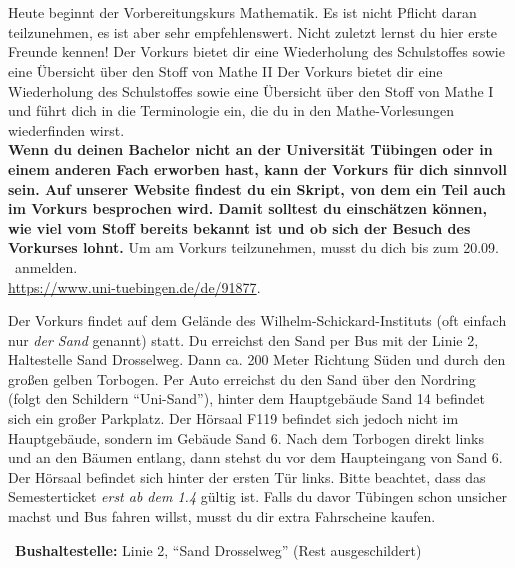 \begin{description}
\ifml
	\item~ %
\else
	\item[Montag, 30. September \YEAR, 10:00 Uhr, Sand 6, Raum F119]\ \\
  Heute beginnt der Vorbereitungskurs Mathematik. Es ist nicht Pflicht daran teilzunehmen,
	es ist aber sehr empfehlenswert. Nicht zuletzt lernst du hier erste Freunde kennen!
	\ifsommersemester
	Der Vorkurs bietet dir eine Wiederholung des Schulstoffes sowie eine Übersicht über den Stoff von Mathe II
	\fi
	\ifwintersemester
	Der Vorkurs bietet dir eine Wiederholung des Schulstoffes sowie eine Übersicht über den Stoff von Mathe I
	\fi
	und führt dich in die Terminologie ein, die du in den Mathe-Vorlesungen wiederfinden wirst.
	\ifmaster
	\\
	\textbf{Wenn du deinen Bachelor nicht an der Universität Tübingen oder in einem anderen Fach erworben hast, kann der Vorkurs für dich sinnvoll sein. Auf unserer Website findest du ein Skript, von dem ein Teil auch im Vorkurs besprochen wird. Damit solltest du einschätzen können, wie viel vom Stoff bereits bekannt ist und ob sich der Besuch des Vorkurses lohnt.}
	\fi
	Um am Vorkurs teilzunehmen, musst du dich bis zum 20.09. \YEAR~anmelden.\\
    \url{https://www.uni-tuebingen.de/de/91877}.

	\ifsommersemester
	Der Vorkurs findet auf dem Gelände des Wilhelm-Schickard-Instituts (oft einfach nur \emph{der Sand} genannt) statt. Du erreichst den Sand per Bus mit der Linie 2, Haltestelle Sand Drosselweg. Dann ca. 200 Meter Richtung Süden und durch den großen gelben Torbogen. Per Auto erreichst du den Sand über den Nordring (folgt den Schildern "`Uni-Sand"'), hinter dem Hauptgebäude Sand 14 befindet sich ein großer Parkplatz. Der Hörsaal F119 befindet sich jedoch nicht im Hauptgebäude, sondern im Gebäude Sand 6. Nach dem Torbogen direkt links und an den Bäumen entlang, dann stehst du vor dem Haupteingang von Sand 6. Der Hörsaal befindet sich hinter der ersten Tür links.
	Bitte beachtet, dass das Semesterticket \emph{erst ab dem 1.4} gültig ist. Falls du davor Tübingen schon unsicher machst und Bus fahren willst, musst du dir extra Fahrscheine kaufen.
	\fi

	~\textbf{Bushaltestelle:} Linie 2, "`Sand Drosselweg"' (Rest ausgeschildert)
\fi


\end{description}
